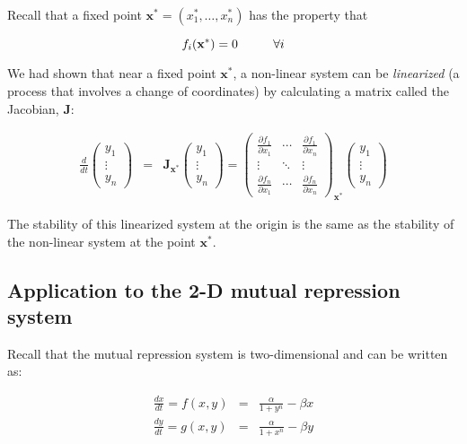 \documentclass{article}
\begin{document}
Recall that a fixed point $\mathbf{x^*}=(x_1^*, \ldots, x_n^*)$ has the property that

\[ f_i(\mathbf{x^*}) = 0 \hspace{1 cm} \forall i \]

We had shown that near a fixed point $\mathbf{x^*}$, a non-linear system can be \textit{linearized} (a process that involves a change of coordinates) by calculating a matrix called the Jacobian, $\mathbf{J}$:

\begin{eqnarray}
\frac{d}{dt} \begin{pmatrix} y_1 \\ \vdots \\ y_n \end{pmatrix} & = &  \mathbf{J}_{\mathbf{x^*}} \begin{pmatrix} y_1 \\ \vdots \\ y_n \end{pmatrix} = \begin{pmatrix} \frac{\partial f_1}{\partial x_1} & \cdots & \frac{\partial f_1}{\partial x_n}\\ \vdots & \ddots & \vdots \\ \frac{\partial f_n}{\partial x_1} & \cdots & \frac{\partial f_n}{\partial x_n} \end{pmatrix}_{\mathbf{x^*}} \begin{pmatrix} y_1 \\ \vdots \\ y_n \end{pmatrix} \label{eqn:generallinearizedsystem}
\end{eqnarray}

The stability of this linearized system at the origin is the same as the stability of the non-linear system at the point $\mathbf{x^*}$.

\subsection*{Application to the 2-D mutual repression system}

Recall that the mutual repression system is two-dimensional and can be written as:

\begin{eqnarray*}
\frac{dx}{dt} = f(x,y)  & =  & \frac{\alpha }{1+ y^n}  -  \beta x\\
\frac{dy}{dt} = g(x,y) &=  &  \frac{\alpha }{1+ x^n} - \beta y
\end{eqnarray*}
\end{document}
